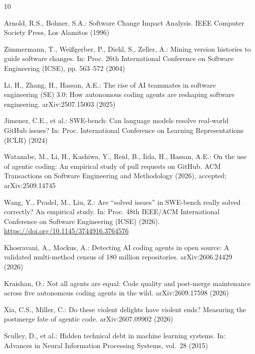 \documentclass[runningheads]{llncs}
\begin{document}
%
%
\begin{thebibliography}{10}

Arnold, R.S., Bohner, S.A.: Software Change Impact Analysis. IEEE Computer Society Press, Los Alamitos (1996)

Zimmermann, T., Wei{\ss}gerber, P., Diehl, S., Zeller, A.: Mining version histories to guide software changes. In: Proc. 26th International Conference on Software Engineering (ICSE), pp. 563--572 (2004)

Li, H., Zhang, H., Hassan, A.E.: The rise of AI teammates in software engineering (SE) 3.0: How autonomous coding agents are reshaping software engineering. arXiv:2507.15003 (2025)

Jimenez, C.E., et al.: SWE-bench: Can language models resolve real-world GitHub issues? In: Proc. International Conference on Learning Representations (ICLR) (2024)

Watanabe, M., Li, H., Kashiwa, Y., Reid, B., Iida, H., Hassan, A.E.: On the use of agentic coding: An empirical study of pull requests on GitHub. ACM Transactions on Software Engineering and Methodology (2026), accepted; arXiv:2509.14745

Wang, Y., Pradel, M., Liu, Z.: Are ``solved issues'' in SWE-bench really solved correctly? An empirical study. In: Proc. 48th IEEE/ACM International Conference on Software Engineering (ICSE) (2026). \url{https://doi.org/10.1145/3744916.3764576}

Khosravani, A., Mockus, A.: Detecting AI coding agents in open source: A validated multi-method census of 180 million repositories. arXiv:2606.24429 (2026)

Kraishan, O.: Not all agents are equal: Code quality and post-merge maintenance across five autonomous coding agents in the wild. arXiv:2609.17598 (2026)

Xia, C.S., Miller, C.: Do these violent delights have violent ends? Measuring the postmerge fate of agentic code. arXiv:2607.09902 (2026)

Sculley, D., et al.: Hidden technical debt in machine learning systems. In: Advances in Neural Information Processing Systems, vol.~28 (2015)


\end{thebibliography}
\end{document}
